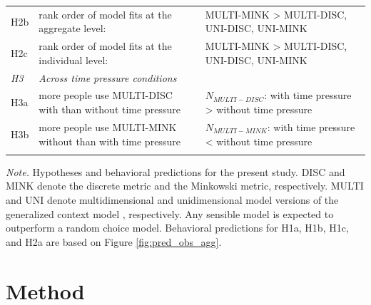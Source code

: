 \documentclass[a4paper,man,natbib]{apa6}
\begin{document}
\begin{table}
\begin{center}
\begin{threeparttable}
\begin{tabular*}{\textwidth}{lp{115mm}p{110mm}}
\addlinespace
H2b & rank order of model fits at the aggregate level: & MULTI-MINK > {MULTI-DISC, UNI-DISC, UNI-MINK}\\
\addlinespace
H2c & rank order of model fits at the individual level: & MULTI-MINK > {MULTI-DISC, UNI-DISC, UNI-MINK}\\
\midrule
\multicolumn{1}{l}{\emph{H3}} & \multicolumn{1}{l}{\emph{Across time pressure conditions}} \\
\addlinespace
H3a & more people use MULTI-DISC with than without time pressure & $N_{MULTI-DISC}$: with time pressure > without time pressure\\
\addlinespace
H3b & more people use MULTI-MINK without than with time pressure & $N_{MULTI-MINK}$: with time pressure < without time pressure\\
\bottomrule
\addlinespace
\end{tabular*}
\begin{tablenotes}[para]
\textit{Note.} Hypotheses and behavioral predictions for the present study. DISC and MINK denote the discrete metric and the Minkowski metric, respectively. MULTI and UNI denote multidimensional and unidimensional model versions of the generalized context model \citep{nosofsky1989further}, respectively. Any sensible model is expected to outperform a random choice model. Behavioral predictions for H1a, H1b, H1c, and H2a are based on Figure \ref{fig:pred_obs_agg}.
\end{tablenotes}
\end{threeparttable}
\end{center}
\end{table}
\vspace{\baselineskip}

\section{Method}
\end{document}
